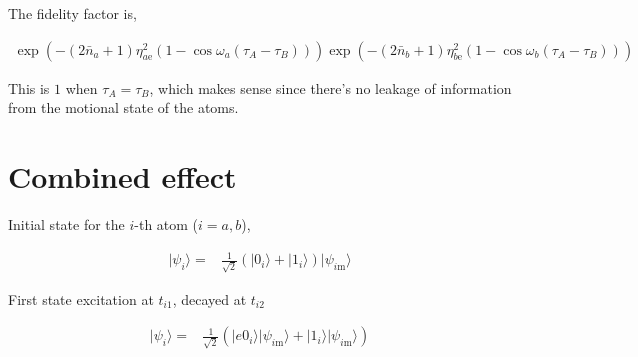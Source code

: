 \documentclass[10pt,fleqn]{article}
\newcommand{\eqar}[1]
{
  \begin{align}
    #1
  \end{align}
}
\newcommand{\paren}[1]{{\left({#1}\right)}}
\begin{document}
The fidelity factor is,
\eqar{
  \exp\paren{
    -\paren{2{\bar n_a}+1}\eta_{a\mathrm{e}}^2\paren{1-\cos\omega_a\paren{\tau_{A}-\tau_{B}}}
  }
  \exp\paren{
    -\paren{2{\bar n_b}+1}\eta_{b\mathrm{e}}^2\paren{1-\cos\omega_b\paren{\tau_{A}-\tau_{B}}}
  }
}
This is $1$ when $\tau_A=\tau_B$, which makes sense since there's no leakage of
information from the motional state of the atoms.

\section{Combined effect}

Initial state for the $i$-th atom ($i=a,b$),
\eqar{
  |\psi_i\rangle=&\frac{1}{\sqrt2}\paren{|0_i\rangle+|1_i\rangle}|\psi_{i\mathrm{m}}\rangle
}
First state excitation at $t_{i1}$, decayed at $t_{i2}$
\eqar{
  |\psi_i\rangle=&\frac{1}{\sqrt2}\paren{|e0_i\rangle|\psi_{i\mathrm{m}}\rangle+|1_i\rangle|\psi_{i\mathrm{m}}\rangle}
}
\end{document}
